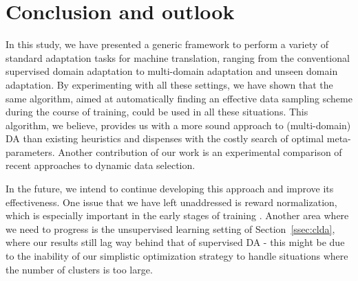 \documentclass[11pt]{article}
\newcommand{\fyDone}[1]{\done[FY]\Todo[FY:]{\textcolor{orange}{#1}}}
\begin{document}
\section{Conclusion and outlook \label{sec:conclusion}}
\fyDone{Write conclusion}
In this study, we have presented a generic framework to perform a variety of standard adaptation tasks for machine translation, ranging from the conventional supervised domain adaptation to multi-domain adaptation and unseen domain adaptation. By experimenting with all these settings, we have shown that the same algorithm, aimed at automatically finding an effective data sampling scheme during the course of training, could be used in all these situations. This algorithm, we believe, provides us with a more sound approach to (multi-domain) DA than existing heuristics and dispenses with the costly search of optimal meta-parameters. Another contribution of our work is an experimental comparison of recent approaches to dynamic data selection.

In the future, we intend to continue developing this approach and improve its effectiveness. One issue that we have left unaddressed is reward normalization, which is especially important in the early stages of training \citep{Kumar19reinforcement}. Another area where we need to progress is the unsupervised learning setting of Section~\ref{ssec:clda}, where our results still lag way behind that of supervised DA - this might be due to the inability of our simplistic optimization strategy to handle situations where the number of clusters is too large.



\end{document}
